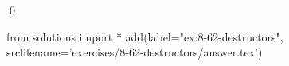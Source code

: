 
\begin{ex}
  \label{ex:8-62-destructors}
  
  \qed
\end{ex}
\begin{python0}
from solutions import *
add(label="ex:8-62-destructors",
    srcfilename='exercises/8-62-destructors/answer.tex')
\end{python0}
